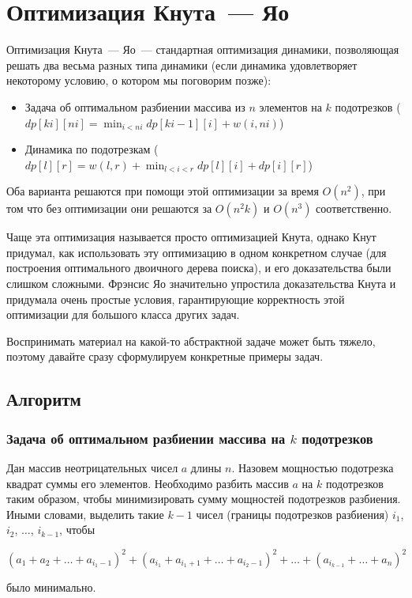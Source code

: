 \chapter{Оптимизация Кнута~--- Яо} \label{knuth-yao-optimization}

Оптимизация Кнута~--- Яо~--- стандартная оптимизация динамики, позволяющая решать два весьма разных типа динамики (если динамика удовлетворяет некоторому условию, о котором мы поговорим позже):

\begin{itemize}
    \item Задача об оптимальном разбиении массива из $n$ элементов на $k$ подотрезков ($dp[ki][ni] = \min_{i < ni} dp[ki - 1][i] + w(i, ni)$)
    \item Динамика по подотрезкам ($dp[l][r] = w(l, r) + \min_{l < i < r} dp[l][i] + dp[i][r]$)
\end{itemize}

Оба варианта решаются при помощи этой оптимизации за время $O(n^2)$, при том что без оптимизации они решаются за $O(n^2 k)$ и $O(n^3)$ соответственно.

\begin{observation}
    Чаще эта оптимизация называется просто оптимизацией Кнута, однако Кнут придумал, как использовать эту оптимизацию в одном конкретном случае (для построения оптимального двоичного дерева поиска), и его доказательства были слишком сложными. Фрэнсис Яо значительно упростила доказательства Кнута и придумала очень простые условия, гарантирующие корректность этой оптимизации для большого класса других задач.
\end{observation}


Воспринимать материал на какой-то абстрактной задаче может быть тяжело, поэтому давайте сразу сформулируем конкретные примеры задач.

\section{Алгоритм}

\subsection{Задача об оптимальном разбиении массива на $k$ подотрезков}

\begin{problem}
    Дан массив неотрицательных чисел $a$ длины $n$. Назовем мощностью подотрезка квадрат суммы его элементов. Необходимо разбить массив $a$ на $k$ подотрезков таким образом, чтобы минимизировать сумму мощностей подотрезков разбиения. Иными словами, выделить такие $k - 1$ чисел (границы подотрезков разбиения) $i_1$, $i_2$, $\ldots$, $i_{k - 1}$, чтобы

    $$(a_1 + a_2 + \ldots + a_{i_1 - 1})^2 + (a_{i_1} + a_{i_1 + 1} + \ldots + a_{i_2 - 1})^2 + \ldots + (a_{i_{k - 1}} + \ldots + a_{n})^2$$

было минимально.
\end{problem}


